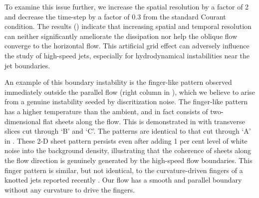\documentclass[twocolumn]{aastex63}
\begin{document}
To examine this issue further, we increase the spatial resolution by a factor of 2 and decrease the time-step by a factor of 0.3 from the standard Courant condition. The results () indicate that increasing spatial and temporal resolution can neither significantly ameliorate the dissipation nor help the oblique flow converge to the horizontal flow. This artificial grid effect can adversely influence the study of high-speed jets, especially for hydrodynamical instabilities near the jet boundaries.

An example of this boundary instability is the finger-like pattern observed immediately outside the parallel flow (right column in ), which we believe to arise from a genuine instability seeded by discritization noise. The finger-like pattern has a higher temperature than the ambient, and in fact consists of two-dimensional flat sheets along the flow. This is demonstrated in  with transverse slices cut through `B' and `C'. The patterns are identical to that cut through `A' in . These 2-D sheet pattern persists even after adding 1 per cent level of white noise into the background density, illustrating that the coherence of sheets along the flow direction is genuinely generated by the high-speed flow boundaries. This finger pattern is similar, but not identical, to the curvature-driven fingers of a knotted jets reported recently \citep{Gourgouliatos2017}. Our flow has a smooth and parallel boundary without any curvature to drive the fingers.
\end{document}
